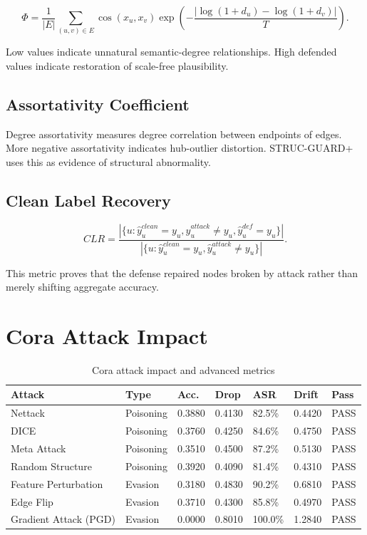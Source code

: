 \documentclass[12pt,oneside]{report}
\begin{document}
$$
\Phi=\frac{1}{|E|}\sum_{(u,v)\in E}\cos(x_u,x_v)\exp\left(-\frac{|\log(1+d_u)-\log(1+d_v)|}{T}\right).
$$

Low values indicate unnatural semantic-degree relationships. High defended values indicate restoration of scale-free plausibility.

\subsection{Assortativity Coefficient}
Degree assortativity measures degree correlation between endpoints of edges. More negative assortativity indicates hub-outlier distortion. STRUC-GUARD+ uses this as evidence of structural abnormality.

\subsection{Clean Label Recovery}

$$
CLR=\frac{|\{u:\hat{y}^{clean}_u=y_u,\hat{y}^{attack}_u\neq y_u,\hat{y}^{def}_u=y_u\}|}{|\{u:\hat{y}^{clean}_u=y_u,\hat{y}^{attack}_u\neq y_u\}|}.
$$

This metric proves that the defense repaired nodes broken by attack rather than merely shifting aggregate accuracy.

\section{Cora Attack Impact}
\begin{longtable}{p{1.25in}p{0.72in}p{0.55in}p{0.55in}p{0.58in}p{0.62in}p{0.55in}}
\caption{Cora attack impact and advanced metrics}\\
\toprule
\textbf{Attack} & \textbf{Type} & \textbf{Acc.} & \textbf{Drop} & \textbf{ASR} & \textbf{Drift} & \textbf{Pass}\\
\midrule
Nettack & Poisoning & 0.3880 & 0.4130 & 82.5\% & 0.4420 & PASS\\
DICE & Poisoning & 0.3760 & 0.4250 & 84.6\% & 0.4750 & PASS\\
Meta Attack & Poisoning & 0.3510 & 0.4500 & 87.2\% & 0.5130 & PASS\\
Random Structure & Poisoning & 0.3920 & 0.4090 & 81.4\% & 0.4310 & PASS\\
Feature Perturbation & Evasion & 0.3180 & 0.4830 & 90.2\% & 0.6810 & PASS\\
Edge Flip & Evasion & 0.3710 & 0.4300 & 85.8\% & 0.4970 & PASS\\
Gradient Attack (PGD) & Evasion & 0.0000 & 0.8010 & 100.0\% & 1.2840 & PASS\\
\bottomrule
\end{longtable}
\end{document}
